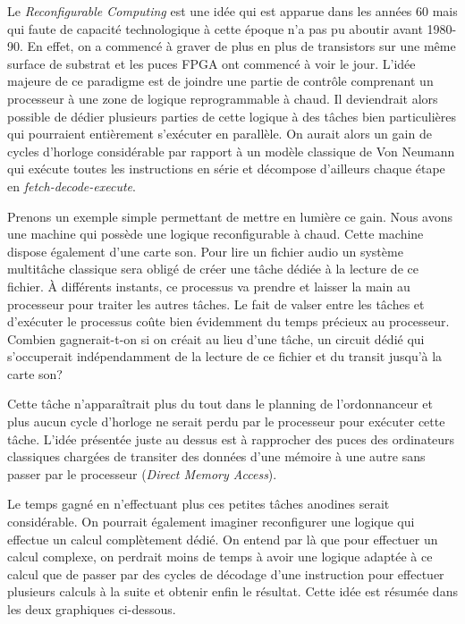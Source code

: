 Le \textit{Reconfigurable Computing} est une idée qui est apparue dans les années 60 \cite{RECOMPUT_WIKI} mais
qui faute de capacité technologique à cette époque n'a pas pu aboutir avant 1980-90.
En effet, on a commencé à graver de plus en plus de transistors sur une même surface
de substrat et les puces FPGA ont commencé à voir le jour.  L'idée majeure de
ce paradigme est de joindre une partie de contrôle comprenant un processeur à une
zone de logique reprogrammable à chaud. Il deviendrait alors possible de dédier
plusieurs parties de cette logique à des tâches bien particulières qui pourraient
entièrement s’exécuter en parallèle. On aurait alors un gain de cycles d'horloge
considérable par rapport à un modèle classique de Von Neumann\cite{NEUMANN} qui exécute toutes les
instructions en série et décompose d'ailleurs chaque étape en \textit{fetch-decode-execute}.

Prenons un exemple simple permettant de mettre en lumière ce gain. Nous avons une
machine qui possède une logique reconfigurable à chaud. Cette machine dispose
également d'une carte son. Pour lire un fichier audio un système multitâche classique
sera obligé de créer une tâche dédiée à la lecture de ce fichier. À différents
instants, ce processus va prendre et laisser la main au processeur pour traiter les
autres tâches. Le fait de valser entre les tâches et d'exécuter le processus coûte
bien évidemment du temps précieux au processeur. Combien gagnerait-t-on si on créait
au lieu d'une tâche, un circuit dédié qui s'occuperait indépendamment de la lecture
de ce fichier et du transit jusqu'à la carte son?

Cette tâche n'apparaîtrait plus du tout dans le planning de l'ordonnanceur et plus
aucun cycle d'horloge ne serait perdu par le processeur pour exécuter cette tâche.
L'idée présentée juste au dessus est à rapprocher des puces des ordinateurs
classiques chargées de transiter des données d'une mémoire à une autre sans passer
par le processeur (\textit{Direct Memory Access}).

Le temps gagné en n'effectuant plus ces petites tâches anodines serait
considérable. On pourrait également imaginer reconfigurer une logique qui effectue un
calcul complètement dédié. On entend par là que pour effectuer un calcul complexe, on
perdrait moins de temps à avoir une logique adaptée à ce calcul que de passer par des
cycles de décodage d'une instruction pour effectuer plusieurs calculs à la suite et
obtenir enfin le résultat. Cette idée est résumée dans les deux graphiques ci-dessous.

